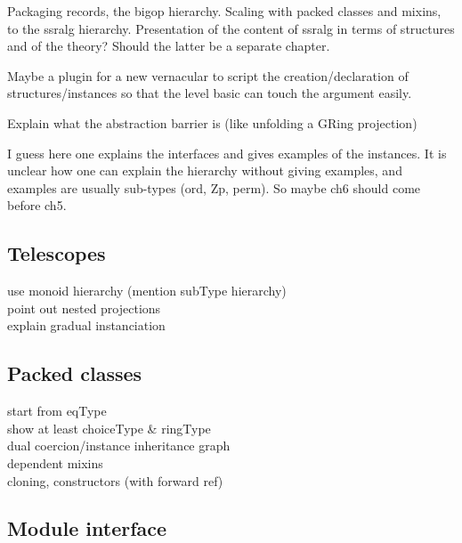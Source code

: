 
Packaging records, the bigop hierarchy.
Scaling with packed classes and mixins, to the ssralg
hierarchy. Presentation of the content of ssralg in terms of structures
and of the theory? Should the latter be a separate chapter.

Maybe a plugin for a new vernacular to script the creation/declaration
of structures/instances so that the level basic can touch the argument
easily.

Explain what the abstraction barrier is (like unfolding a GRing projection)


I guess here one explains the interfaces and gives examples of the instances.
It is unclear how one can explain the hierarchy without giving examples,
and examples are usually sub-types (ord, Zp, perm).  So maybe ch6 should
come before ch5.



\subsection{Telescopes}

use monoid hierarchy (mention subType hierarchy)\\
point out nested projections\\
explain gradual instanciation\\

\subsection{Packed classes}

start from eqType\\
show at least choiceType \& ringType\\
dual coercion/instance inheritance graph\\
dependent mixins\\
cloning, constructors (with forward ref)

\subsection{Module interface}

